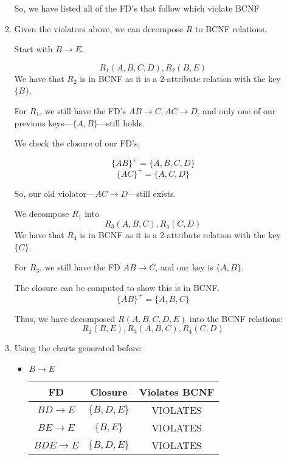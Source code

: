 \documentclass[12pt,letterpaper]{article}
\newcommand{\closure}[1]{\{#1\}^+}
\begin{document}
\begin{enumerate}
\begin{enumerate}
          So, we have listed all of the FD's that follow which violate BCNF

        \item
          Given the violators above, we can decompose $R$ to BCNF relations.

          Start with $B \rightarrow E$.

          \[R_1(A, B, C, D), R_2(B, E)\]
          We have that $R_2$ is in BCNF as it is a 2-attribute relation with the key $\{B\}$.

          For $R_1$, we still have the FD's $AB \rightarrow C, AC \rightarrow D$,
          and only one of our previous keys---$\{A, B\}$---still holds.

          We check the closure of our FD's.

          \[\closure{AB} = \{A, B, C, D\}\]
          \[\closure{AC} = \{A, C, D\}\]

          So, our old violator---$AC \rightarrow D$---still exists.

          We decompose $R_1$ into
          \[R_3(A, B, C), R_4(C, D)\]
          We have that $R_4$ is in BCNF as it is a 2-attribute relation with the key $\{C\}$.

          For $R_3$, we still have the FD $AB \rightarrow C$, and our key is $\{A, B\}$.

          The closure can be computed to show this is in BCNF.
          \[\closure{AB} = \{A, B, C\}\]

          Thus, we have decomposed $R(A, B, C, D, E)$ into the BCNF relations:
          \[R_2(B, E), R_3(A, B, C), R_4(C, D)\]

        \item
          Using the charts generated before:

          \begin{itemize}
            \item $B \rightarrow E$

              \begin{tabular}{c | c | c |}
                FD                    & Closure             & Violates BCNF \\
                \hline
                $BD \rightarrow E$    & $\{B, D, E\}$       & VIOLATES \\
                \hline
                $BE \rightarrow E$    & $\{B, E\}$          & VIOLATES \\
                \hline
                $BDE \rightarrow E$   & $\{B, D, E\}$       & VIOLATES \\
                \hline
              \end{tabular}


\end{itemize}
\end{enumerate}
\end{enumerate}
\end{document}
